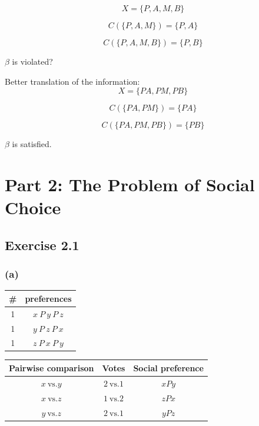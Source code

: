 \documentclass[a4paper]{article}
\begin{document}
\[X=\{P,A,M,B \} \]

\[C(\{P,A,M\})=\{P, A\} \]

\[C(\{P,A,M,B\})=\{P, B\} \]

$\beta$ is violated?

Better translation of the information:
\[X=\{PA, PM, PB \} \]

\[C(\{PA,PM\})=\{PA\} \]

\[C(\{PA,PM,PB\})=\{PB\} \]

$\beta$ is satisfied.

\section*{Part 2: The Problem of Social Choice}

\subsection*{Exercise 2.1}

\subsubsection*{(a)}

\begin{table}[!htbp]
    \centering
    \begin{tabular}{c|c|}
        \# & preferences         \\ 
        \hline
        1  & $x\: P\: y\: P\: z$ \\
        1  & $y\: P\: z\: P\: x$ \\
        1  & $z\: P\: x\: P\: y$ \\
        \hline
    \end{tabular}
\end{table}

\begin{table}[!htbp]
    \centering
    \begin{tabular}{ccc}
        \hline
        Pairwise comparison & Votes               & Social preference  \\ 
        \hline
        $x\: \text{vs.} y$  & $2\: \text{vs.} 1$  & $xPy$              \\
        $x\: \text{vs.} z$  & $1\: \text{vs.} 2$  & $zPx$              \\
        $y\: \text{vs.} z$  & $2\: \text{vs.} 1$  & $yPz$              \\
        \hline
    \end{tabular}
\end{table}
\end{document}
